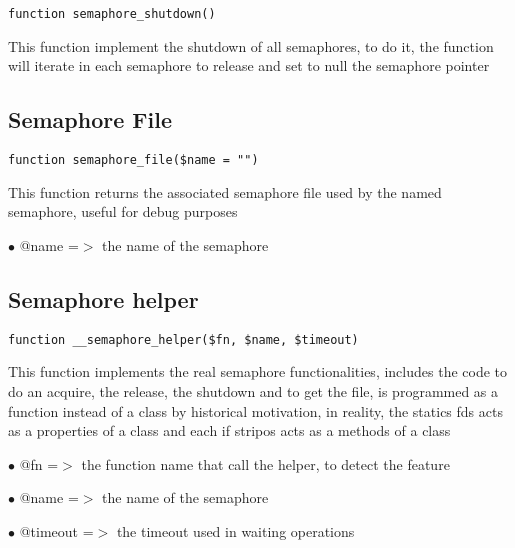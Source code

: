 \documentclass[a4paper]{book}
\begin{document}
\begin{lstlisting}
function semaphore_shutdown()
\end{lstlisting}

This function implement the shutdown of all semaphores, to do it,
the function will iterate in each semaphore to release and set to
null the semaphore pointer

\hypertarget{toc234}{}
\subsection{Semaphore File}

\begin{lstlisting}
function semaphore_file($name = "")
\end{lstlisting}

This function returns the associated semaphore file used by the
named semaphore, useful for debug purposes

\begin{compactitem}
\item[\color{myblue}$\bullet$] @name =$>$ the name of the semaphore
\end{compactitem}

\hypertarget{toc235}{}
\subsection{Semaphore helper}

\begin{lstlisting}
function __semaphore_helper($fn, $name, $timeout)
\end{lstlisting}

This function implements the real semaphore functionalities, includes
the code to do an acquire, the release, the shutdown and to get the
file, is programmed as a function instead of a class by historical
motivation, in reality, the statics fds acts as a properties of a
class and each if stripos acts as a methods of a class

\begin{compactitem}
\item[\color{myblue}$\bullet$] @fn      =$>$ the function name that call the helper, to detect the feature
\item[\color{myblue}$\bullet$] @name    =$>$ the name of the semaphore
\item[\color{myblue}$\bullet$] @timeout =$>$ the timeout used in waiting operations
\end{compactitem}
\end{document}
